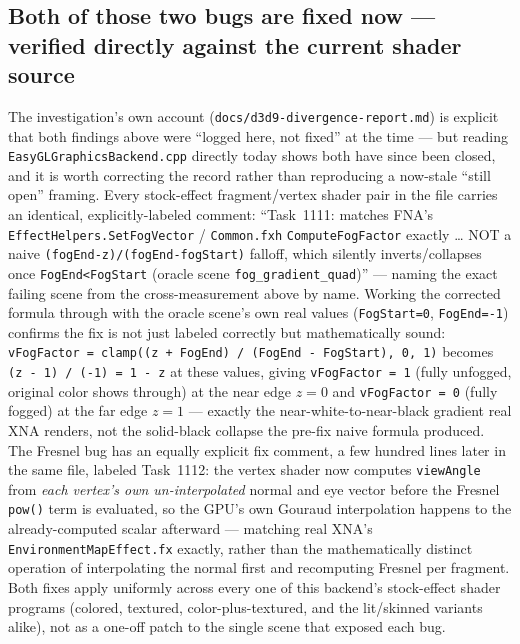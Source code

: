 \subsection{Both of those two bugs are fixed now --- verified directly against the current shader source}

The investigation's own account (\texttt{docs/d3d9-divergence-report.md}) is explicit that both
findings above were ``logged here, not fixed'' at the time --- but reading
\texttt{EasyGLGraphicsBackend.cpp} directly today shows both have since been closed, and it is
worth correcting the record rather than reproducing a now-stale ``still open'' framing. Every
stock-effect fragment/vertex shader pair in the file carries an identical, explicitly-labeled
comment: ``Task~1111: matches FNA's \texttt{EffectHelpers.SetFogVector} / \texttt{Common.fxh}
\texttt{ComputeFogFactor} exactly \dots{} NOT a naive \texttt{(fogEnd-z)/(fogEnd-fogStart)}
falloff, which silently inverts/collapses once \texttt{FogEnd<FogStart} (oracle scene
\texttt{fog\_gradient\_quad})'' --- naming the exact failing scene from the cross-measurement
above by name. Working the corrected formula through with the oracle scene's own real values
(\texttt{FogStart=0}, \texttt{FogEnd=-1}) confirms the fix is not just labeled correctly but
mathematically sound: \texttt{vFogFactor = clamp((z + FogEnd) / (FogEnd - FogStart), 0, 1)}
becomes \texttt{(z - 1) / (-1) = 1 - z} at these values, giving \texttt{vFogFactor = 1} (fully
unfogged, original color shows through) at the near edge $z=0$ and \texttt{vFogFactor = 0}
(fully fogged) at the far edge $z=1$ --- exactly the near-white-to-near-black gradient real XNA
renders, not the solid-black collapse the pre-fix naive formula produced. The Fresnel bug has
an equally explicit fix comment, a few hundred lines later in the same file, labeled
Task~1112: the vertex shader now computes \texttt{viewAngle} from \emph{each vertex's own
un-interpolated} normal and eye vector before the Fresnel \texttt{pow()} term is evaluated, so
the GPU's own Gouraud interpolation happens to the already-computed scalar afterward --- matching
real XNA's \texttt{EnvironmentMapEffect.fx} exactly, rather than the mathematically distinct
operation of interpolating the normal first and recomputing Fresnel per fragment. Both fixes
apply uniformly across every one of this backend's stock-effect shader programs (colored,
textured, color-plus-textured, and the lit/skinned variants alike), not as a one-off patch to
the single scene that exposed each bug.

